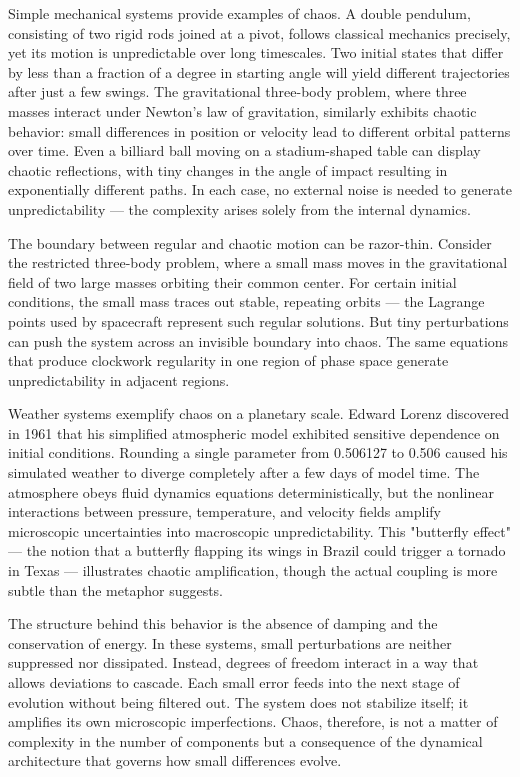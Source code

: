 Simple mechanical systems provide examples of chaos. A double pendulum, consisting of two rigid rods joined at a pivot, follows classical mechanics precisely, yet its motion is unpredictable over long timescales. Two initial states that differ by less than a fraction of a degree in starting angle will yield different trajectories after just a few swings. The gravitational three-body problem, where three masses interact under Newton's law of gravitation, similarly exhibits chaotic behavior: small differences in position or velocity lead to different orbital patterns over time. Even a billiard ball moving on a stadium-shaped table can display chaotic reflections, with tiny changes in the angle of impact resulting in exponentially different paths. In each case, no external noise is needed to generate unpredictability — the complexity arises solely from the internal dynamics.

The boundary between regular and chaotic motion can be razor-thin. Consider the restricted three-body problem, where a small mass moves in the gravitational field of two large masses orbiting their common center. For certain initial conditions, the small mass traces out stable, repeating orbits — the Lagrange points used by spacecraft represent such regular solutions. But tiny perturbations can push the system across an invisible boundary into chaos. The same equations that produce clockwork regularity in one region of phase space generate unpredictability in adjacent regions.

Weather systems exemplify chaos on a planetary scale. Edward Lorenz discovered in 1961 that his simplified atmospheric model exhibited sensitive dependence on initial conditions. Rounding a single parameter from 0.506127 to 0.506 caused his simulated weather to diverge completely after a few days of model time. The atmosphere obeys fluid dynamics equations deterministically, but the nonlinear interactions between pressure, temperature, and velocity fields amplify microscopic uncertainties into macroscopic unpredictability. This "butterfly effect" — the notion that a butterfly flapping its wings in Brazil could trigger a tornado in Texas — illustrates chaotic amplification, though the actual coupling is more subtle than the metaphor suggests.

The structure behind this behavior is the absence of damping and the conservation of energy. In these systems, small perturbations are neither suppressed nor dissipated. Instead, degrees of freedom interact in a way that allows deviations to cascade. Each small error feeds into the next stage of evolution without being filtered out. The system does not stabilize itself; it amplifies its own microscopic imperfections. Chaos, therefore, is not a matter of complexity in the number of components but a consequence of the dynamical architecture that governs how small differences evolve.


